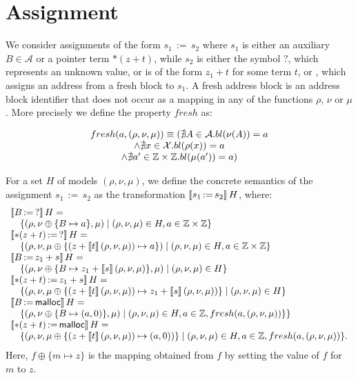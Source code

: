 \section{Assignment}

We consider assignments of the form $s_1\,{:=}\,s_2$ where $s_1$ is either an auxiliary $B \in \mathcal{A}$ or a pointer term $*(z+t)$, while $s_2$ is either the symbol $?$, which represents an unknown value, or is of the form $z_1 + t$ for some term $t$, or \malloc, which assigns an address from a fresh block to $s_1$.
A fresh address block is an address block identifier that does not occur as a mapping in any of the functions $\rho$, $\nu$ or $\mu$.
More precisely we define the property $fresh$ as:

\[ \begin{array}{c}
		fresh(a, (\rho,\nu,\mu)) \equiv
		(\nexists A\in \mathcal{A} . bl(\nu(A)) = a      \\
		\land \nexists x\in \mathcal{X}. bl(\rho(x)) = a \\
		\land \nexists a'\in \mathbb{Z} \times \mathbb{Z} . bl(\mu(a')) = a)
	\end{array}
\]

For a set $H$ of models $(\rho,\nu,\mu)$, we define the concrete semantics of the assignment
$s_1\,{:=}\,s_2$ as the transformation
$\llbracket s_1\,{:=}\,s_2\rrbracket\,H$, where:
\[
	\begin{array}{l}
		\llbracket B\,{:=}\,?\rrbracket\,H =
		\\
		\quad \{(\rho,\nu\oplus\{B\mapsto a\},\mu)\mid(\rho,\nu,\mu)\in H,a\in\mathbb{Z} \times \mathbb{Z}\}                    \\
		\llbracket*(z+t)\,{:=}\,?\rrbracket\,H =                                                                     \\
		\quad \{(\rho,\nu,\mu\oplus\{(z+\llbracket t\rrbracket\,(\rho,\nu,\mu))\mapsto a\})
		\mid(\rho,\nu,\mu)\in H,a\in\mathbb{Z} \times \mathbb{Z}\}                                                    \\
		\llbracket B\,{:=}\,z_1+s\rrbracket\,H =                                                                      \\
		\quad \{(\rho,\nu\oplus\{B\mapsto z_1+\llbracket s\rrbracket\,(\rho,\nu,\mu)\},\mu)\mid(\rho,\nu,\mu)\in H\} \\
		\llbracket*(z+t)\,{:=}\,z_1+s\rrbracket\,H =                                                                 \\
		\quad \{(\rho,\nu,\mu\oplus\{(z+\llbracket t\rrbracket\,(\rho,\nu,\mu))\mapsto z_1+\llbracket s\rrbracket\,(\rho,\nu,\mu))\}
		\mid(\rho,\nu,\mu)\in H\}                                                            \\
		\llbracket B\,{:=}\,\textsf{malloc}\rrbracket\,H =                                                                    \\
		\quad \{(\rho,\nu\oplus\{B\mapsto (a,0)\},\mu)\mid
		(\rho,\nu,\mu)\in H, a\in \mathbb{Z},
	  fresh(a, (\rho,\nu,\mu))\}\}                                                       \\
		\llbracket*(z+t)\,{:=}\,\textsf{malloc}\rrbracket\,H =
		\\
		\quad\{(\rho,\nu,\mu\oplus\{(z+\llbracket t\rrbracket\,(\rho,\nu,\mu))\mapsto (a,0))\}\mid
		(\rho,\nu,\mu)\in H, a\in \mathbb{Z}, fresh(a, (\rho, \nu, \mu))\}.
	\end{array}
\]
Here,
$f\oplus\{m\mapsto z\}$ is the mapping obtained
from $f$ by
setting the value of $f$ for $m$ to $z$.


